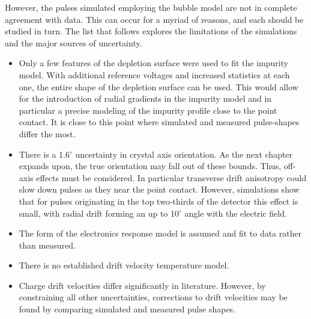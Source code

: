 However, the pulses simulated employing the bubble model are not in complete agreement with data. This can occur for a myriad of reasons, and each should be studied in turn. The list that follows explores the limitations of the simulations and the major sources of uncertainty. 
\begin{itemize}
	\item Only a few features of the depletion surface were used to fit the impurity model. With additional reference voltages and increased statistics at each one, the entire shape of the depletion surface can be used. This would allow for the introduction of radial gradients in the impurity model and in particular a precise modeling of the impurity profile close to the point contact. It is close to this point where simulated and measured pulse-shapes differ the most. 
	\item There is a 1.6$^\circ$ uncertainty in crystal axis orientation. As the next chapter expands upon, the true orientation may fall out of these bounds. Thus, off-axis effects must be considered. In particular transverse drift anisotropy could slow down pulses as they near the point contact. However, simulations show that for pulses originating in the top two-thirds of the detector this effect is small, with radial drift forming an up to 10$^\circ$ angle with the electric field. 
	\item The form of the electronics response model is assumed and fit to data rather than measured. 
	\item There is no established drift velocity temperature model.
	\item Charge drift velocities differ significantly in literature. However, by constraining all other uncertainties, corrections to drift velocities may be found by comparing simulated and measured pulse shapes.
\end{itemize}  